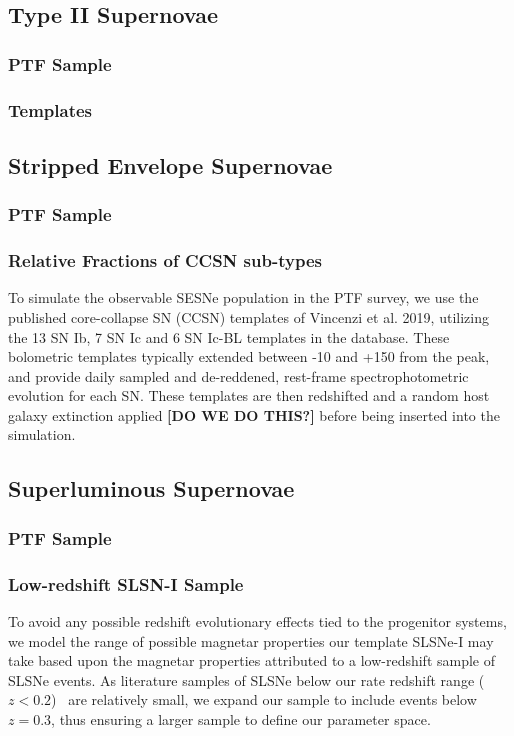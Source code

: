 \documentclass[a4paper,fleqn,usenatbib]{mnras}
\newcommand{\angus}[1]{\color{JungleGreen}#1\color{black}}
\newcommand{\comment}[1]{\textbf{[#1]}}
\begin{document}
\subsection{Type II Supernovae}
\subsubsection{PTF Sample}
\subsubsection{Templates}

\subsection{Stripped Envelope Supernovae}

\subsubsection{PTF Sample}
\subsubsection{Relative Fractions of CCSN sub-types}
To simulate the observable SESNe population in the PTF survey, we use the published core-collapse SN (CCSN) templates of {\angus{Vincenzi et al. 2019}}, utilizing the 13 SN Ib, 7 SN Ic and 6 SN Ic-BL templates in the database. These bolometric templates typically extended between -10 and +150 from the peak, and provide daily sampled and de-reddened, rest-frame spectrophotometric evolution for each SN. These templates are then redshifted and {\angus{a random host galaxy extinction applied \comment{DO WE DO THIS?}}} before being inserted into the simulation.

\subsection{Superluminous Supernovae}
\subsubsection{PTF Sample}
\subsubsection{Low-redshift SLSN-I Sample}
To avoid any possible redshift evolutionary effects tied to the progenitor systems, we model the range of possible magnetar properties our template SLSNe-I may take based upon the magnetar properties attributed to a low-redshift sample of SLSNe events. As literature samples of SLSNe below our \angus{rate redshift range ($z<0.2$)~} are relatively small, we expand our sample to include events below $z=0.3$, thus ensuring a larger sample to define our parameter space. 
\end{document}
